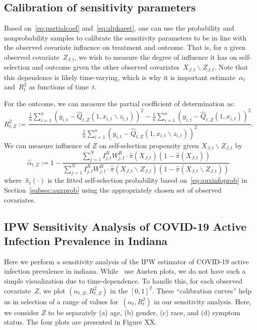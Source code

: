 \documentclass[12pt]{amsart}
\numberwithin{equation}{section}
\theoremstyle{plain}
\begin{document}
\subsection{Calibration of sensitivity parameters}

Based on~\eqref{eq:partialcoef} and~\eqref{eq:alphaest}, one can use the probability and nonprobability samples to calibrate the sensitivity parameters to be in line with the observed covariate influence on treatment and outcome.  That is, for a given observed covariate~$Z_{J,t}$, we wish to measure the degree of influence it has on self-selection and outcome given the other observed covariates~$X_{J,t} \backslash Z_{J,t}$.  Note that this dependence is likely time-varying, which is why it is important estimate~$\alpha_t$ and~$R_t^2$ as functions of time~$t$.

For the outcome, we can measure the partial coefficient of determination as:
$$
R_{t, Z}^2 := \frac{\frac{1}{n} \sum_{i=1}^n (y_{i,t} - \hat Q_{t,Z} (1, x_{i,t} \backslash z_{i,t}) )^2 - \frac{1}{n} \sum_{i=1}^n (y_{i,t} - \hat Q_{t,Z} (1, x_{i,t}) )^2}{\frac{1}{n} \sum_{i=1}^n (y_{i,t} - \hat Q_{t,Z} (1, x_{i,t} \backslash z_{i,t}) )^2}.
$$
We can measure influence of $Z$ on self-selection propensity given $X_{J,t} \backslash Z_{J,t}$ by
$$
\hat \alpha_{t, Z} := 1 - \frac{\sum_{j=1}^N I_{j,t}^R W_{j,t}^R \cdot \hat \pi(X_{J,t}) (1- \hat \pi(X_{J,t}))}{\sum_{j=1}^N I_{j,t}^R W_{j,t}^R \cdot \hat \pi(X_{J,t} \backslash Z_{J,t}) (1- \hat \pi(X_{J,t} \backslash Z_{J,t}))}
$$
where~$\hat \pi_t (\cdot)$ is the fitted self-selection probability based on~\eqref{eq:auxinfoprob} in Section~\ref{subsec:auxprob} using the appropriately chosen set of observed covariates.

\subsection{IPW Sensitivity Analysis of COVID-19 Active Infection Prevalence in Indiana}

Here we perform a sensitivity analysis of the IPW estimator of COVID-19 active infection prevalence in indiana.  While~\cite{Veitch2020} use Austen plots, we do not have such a simple visualization due to time-dependence.  To handle this, for each observed covariate~$Z$, we plot $(\alpha_{t,Z}, R^2_{t,Z})$ in the $[0,1]^2$.  These ``calibration curves'' help us in selection of a range of values for~$(\alpha_t, R^2_t)$ in our sensitivity analysis. Here, we consider $Z$ to be separately (a) age, (b) gender, (c) race, and (d) symptom status.  The four plots are presented in Figure XX.










\end{document}
